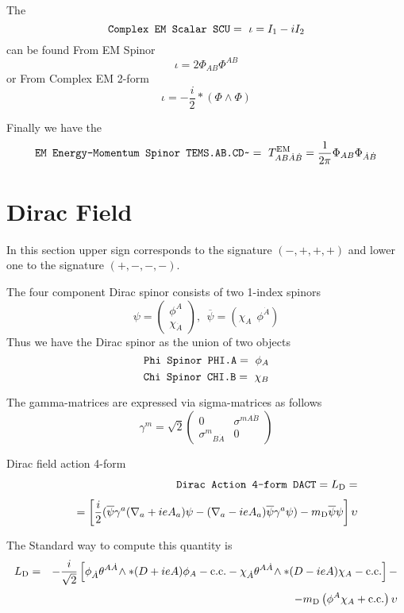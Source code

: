 \documentclass[twoside,openright]{report}
\newcommand{\grgtt}{\ttfamily}
\newcommand{\object}[2]{%
\begin{equation}
\mbox{\comm{#1}} =\ #2
\end{equation}}
\renewcommand{\tt}{\grgtt}
\newcommand{\cc}{{\tt \char'176}}           %
\newcommand{\comm}[1]{{\upshape\tt#1}}    %
\begin{document}
The
\object{Complex EM Scalar SCU}{\iota=I_1-iI_2}
can be found {\tt From EM Spinor}
\begin{equation}
\iota = 2\Phi_{AB}\Phi^{AB}
\end{equation}
or {\tt From Complex EM 2-form}
\begin{equation}
\iota = -\frac{i}{2} *(\Phi\wedge\Phi)
\end{equation}

Finally we have the
\object{EM Energy-Momentum Spinor TEMS.AB.CD\cc}
{T^{\rm EM}_{AB\dot A\dot B}=\frac{1}{2\pi}\Phi_{AB}\Phi_{\dot A\dot B}}


\section{Dirac Field}

In this section upper sign corresponds to the
signature ${\scriptstyle(-,+,+,+)}$ and lower one to the
signature ${\scriptstyle(+,-,-,-)}$.

The four component Dirac spinor consists of two 1-index spinors
\begin{equation}
\psi=\left(\begin{array}{c}\phi^A\\ \chi_{\dot A}\end{array}\right),\ \
\overline\psi=\left(\chi_A\ \ \phi^{\dot A}\right)
\end{equation}
Thus we have the {\tt Dirac spinor} as the union of two objects
\object{Phi Spinor     PHI.A}{\phi_A}
\object{Chi Spinor     CHI.B}{\chi_B}

The gamma-matrices are expressed via sigma-matrices as follows
\begin{equation}
\gamma^m=\sqrt2\left(\begin{array}{cc}
0&\sigma^{mA\dot B}\\ \sigma^m\!{}_{B\dot A}&0\end{array}\right)
\end{equation}

Dirac field action 4-form
\begin{eqnarray}
&&\mbox{\tt Dirac Action 4-form  DACT}=L_{\rm D}=\nonumber\\[1mm]
&&\quad=\left[\frac{i}2(\overline\psi\gamma^a
(\nabla_a+ieA_a)\psi-(\nabla_a-ieA_a)\overline\psi\gamma^a\psi)
-m_{\rm D}\overline\psi\psi\right]\upsilon
\end{eqnarray}

The {\tt Standard way} to compute this quantity is
\begin{eqnarray}
L_{\rm D} &=& -\frac{i}{\sqrt2}\left[
\phi_{\dot A}\theta^{A\dot A}\!\wedge*(D+ieA)\phi_A-{\rm c.c.}
-\chi_{\dot A} \theta^{A\dot A}\!\wedge*(D-ieA)\chi_A -{\rm c.c.}\right]-
\nonumber\\[1mm]&&\qquad\qquad\quad
-m_{\rm D}\left(\phi^A\chi_A+{\rm c.c.}\right)\upsilon
\end{eqnarray}
\end{document}

